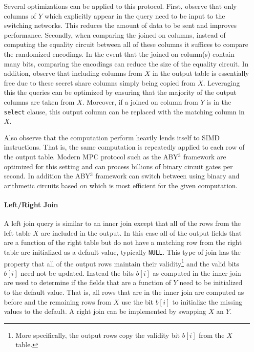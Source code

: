 Several optimizations can be applied to this protocol. First, observe that only columns of $Y$ which explicitly appear in the query need to be input to the switching networks. This reduces the amount of data to be sent and improves performance. Secondly, when comparing the joined on columns, instead of computing the equality circuit between all of these columns it suffices to compare the randomized encodings. In the event that the joined on column(s) contain many bits, comparing the encodings can reduce the size of the equality circuit. In addition, observe that including columns from $X$ in the output table is essentially free due to these secret share columns simply being copied from $X$. Leveraging this the queries can be optimized by ensuring that the majority of the output columns are taken from $X$. Moreover, if a joined on column from $Y$ is in the \texttt{select} clause, this output column can be replaced with the matching column in $X$.

Also observe that the computation perform heavily lends itself to SIMD instructions. That is, the same computation is repeatedly applied to each row of the output table. Modern MPC protocol such as the ABY$^3$ framework \cite{aby3,highthroughput} are optimized for this setting and can process billions of binary circuit gates per second\cite{highthroughput}. In addition the ABY$^3$ framework can switch between using binary and arithmetic circuits based on which is most efficient for the given computation. 

\paragraph{Left/Right Join}

A left join query is similar to an inner join except that all of the rows from the left table $X$ are included in the output. In this case all of the output fields that are a function of the right table but do not have a matching row from the right table are initialized as a default value, typically \texttt{NULL}.  This type of join has the property that all of the output rows maintain their validity\footnote{More specifically, the output rows copy the validity bit $b[i]$ from the $X$ table.} and the valid bits $b[i]$ need not be updated. Instead the bits $b[i]$ as computed in the inner join are used to determine if the fields that are a function of $Y$ need to be initialized to the default value. That is, all rows that are in the inner join are computed as before and the remaining rows from $X$ use the bit $b[i]$ to initialize the missing values to the default. A right join can be implemented by swapping $X$ an $Y$.

